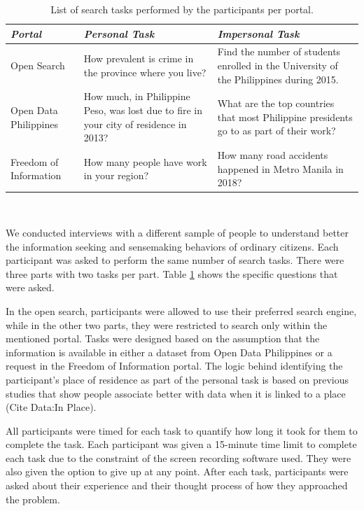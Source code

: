 \documentclass{sigchi}
\begin{document}
\begin{table}
  \centering
  \begin{tabular}{l p{5.2cm} p{5.2cm}}
    {\small\textit{Portal}}
    & {\small \textit{Personal Task}}
      & {\small \textit{Impersonal Task}}\\
    \midrule
    Open Search & How prevalent is crime in the province where you live? & Find the number of students enrolled in the University of the Philippines during 2015.\\
    Open Data Philippines & How much, in Philippine Peso,  was lost due to fire in your city of residence in 2013? & What are the top countries that most Philippine presidents go to as part of their work? \\
    Freedom of Information & How many people have work in your region? & How many road accidents happened in Metro Manila in 2018?
  \end{tabular}
  \caption{List of search tasks performed by the participants per portal.}~\label{tab:searchtasks}
\end{table}

We conducted interviews with a different sample of people to understand better the information seeking and sensemaking behaviors of ordinary citizens. Each participant was asked to perform the same number of search tasks. There were three parts with two tasks per part. Table \ref{tab:searchtasks} shows the specific questions that were asked. 

In the open search, participants were allowed to use their preferred search engine, while in the other two parts, they were restricted to search only within the mentioned portal. Tasks were designed based on the assumption that the information is available in either a dataset from Open Data Philippines or a request in the Freedom of Information portal. The logic behind identifying the participant's place of residence as part of the personal task is based on previous studies that show people associate better with data when it is linked to a place (Cite Data:In Place).

All participants were timed for each task to quantify how long it took for them to complete the task. Each participant was given a 15-minute time limit to complete each task due to the constraint of the screen recording software used. They were also given the option to give up at any point. After each task, participants were asked about their experience and their thought process of how they approached the problem.
\end{document}
